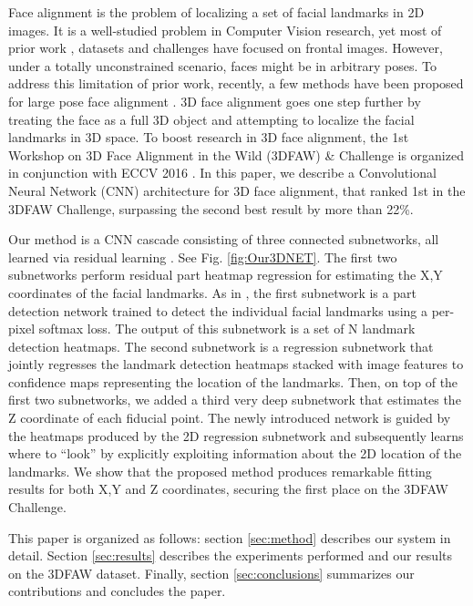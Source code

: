 \documentclass[runningheads]{llncs}
\begin{document}
Face alignment is the problem of localizing a set of facial landmarks in 2D images. It is a well-studied problem in Computer Vision research, yet most of prior work \cite{Cao2012shaperegression, xiong2013supervised}, datasets \cite{sagonas2013semi, sagonas2013300} and challenges  \cite{sagonas2013300,Shen15} have focused on frontal images. However, under a totally unconstrained scenario, faces might be in arbitrary poses. To address this limitation of prior work, recently, a few methods have been proposed for large pose face alignment \cite{jourabloo2015pose,jourabloo2016large,zhu2015face,myBMVC2016}. 3D face alignment goes one step further by treating the face as a full 3D object and attempting to localize the facial landmarks in 3D space. To boost research in 3D face alignment, the 1st Workshop on 3D Face Alignment in the Wild (3DFAW) \& Challenge is organized in conjunction with ECCV 2016 \cite{Workshop3DFAW}. In this paper, we describe a Convolutional Neural Network (CNN) architecture for 3D face alignment, that ranked 1st in the 3DFAW Challenge, surpassing the second best result by more than 22\%.

Our method is a CNN cascade consisting of three connected subnetworks, all learned via residual learning \cite{he2015deep,he2016identity}. See Fig. \ref{fig:Our3DNET}. The first two subnetworks perform residual part heatmap regression \cite{myECCV2016} for estimating the X,Y coordinates of the facial landmarks. As in \cite{myECCV2016}, the first subnetwork is a part detection network trained to detect the individual facial landmarks using a per-pixel softmax loss. The output of this subnetwork is a set of N landmark detection heatmaps. The second subnetwork is a regression subnetwork that jointly regresses the landmark detection heatmaps stacked with image features to confidence maps representing the location of the landmarks. Then, on top of the first two subnetworks, we added a third very deep subnetwork that estimates the Z coordinate of each fiducial point. The newly introduced network is guided by the heatmaps produced by the 2D regression subnetwork and subsequently learns where to ``look'' by explicitly exploiting information about the 2D location of the landmarks. We show that the proposed method produces remarkable fitting results for both X,Y and Z coordinates, securing the first place on the 3DFAW Challenge.

This paper is organized as follows: section \ref{sec:method} describes our system in detail. Section \ref{sec:results} describes the experiments performed and our results on the 3DFAW dataset. Finally, section \ref{sec:conclusions} summarizes our contributions and concludes the paper.
\end{document}

